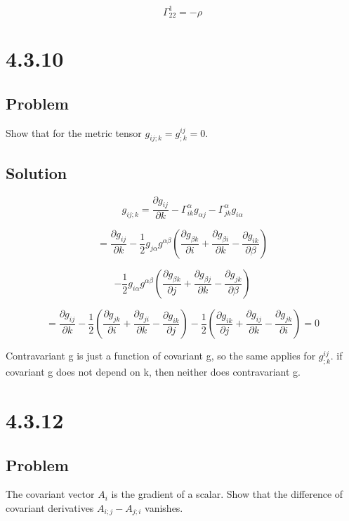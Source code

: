 \documentclass[12pt]{article}
\begin{document}
\[
    \Gamma_{2 2}^1 = -\rho
\]

\newpage
\section{4.3.10}

\subsection{Problem}

Show that for the metric tensor \(g_{ij; k} = g^{ij}_{;k} = 0\).

\subsection{Solution}

\[
    g_{ij;k} = \frac{\partial g_{ij}}{\partial k} - \Gamma_{ik}^\alpha g_{\alpha j} - \Gamma_{jk}^\alpha g_{i\alpha}
\]

\[
    = \frac{\partial g_{ij}}{\partial k} - \frac{1}{2} g_{j\alpha} g^{\alpha \beta} \left(\frac{\partial g_{\beta k}}{\partial i} + \frac{\partial g_{\beta i}}{\partial k} - \frac{\partial g_{ik}}{\partial \beta} \right)
\]

\[
    - \frac{1}{2} g_{i \alpha} g^{\alpha \beta}
    \left(\frac{\partial g_{\beta k}}{\partial j} + \frac{\partial g_{\beta j}}{\partial k} - \frac{\partial g_{jk}}{\partial \beta} \right)
\]

\[
    = \frac{\partial g_{ij}}{\partial k} - \frac{1}{2} \left( \frac{\partial g_{jk}}{\partial i} + \frac{\partial g_{ji}}{\partial k} - \frac{\partial g_{ik}}{\partial j} \right) - \frac{1}{2} \left( \frac{\partial g_{ik}}{\partial j} + \frac{\partial g_{ij}}{\partial k} - \frac{\partial g_{jk}}{\partial i} \right) = 0
\]

Contravariant g is just a function of covariant g, so the same applies for \(g^{ij}_{;k}\).
if covariant g does not depend on k, then neither does contravariant g.

\newpage
\section{4.3.12}

\subsection{Problem}

The covariant vector \(A_i\) is the gradient of a scalar. Show that the difference of covariant
derivatives \(A_{i;j} - A_{j;i}\) vanishes.
\end{document}
